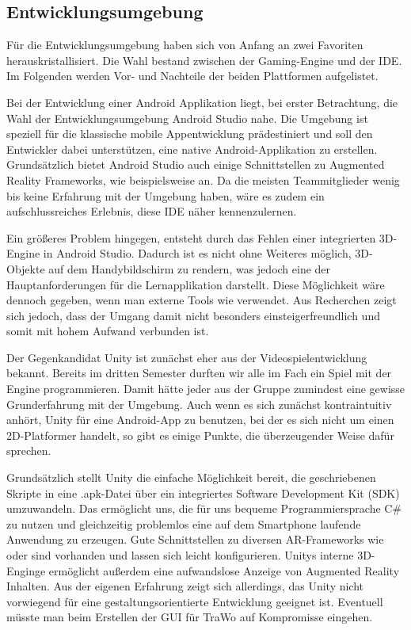 \subsection{Entwicklungsumgebung}\label{entwicklungsumgebung}
Für die Entwicklungsumgebung haben sich von Anfang an zwei Favoriten herauskristallisiert. Die Wahl bestand zwischen der Gaming-Engine  und der  IDE. Im Folgenden werden Vor- und Nachteile der beiden Plattformen aufgelistet.

Bei der Entwicklung einer Android Applikation liegt, bei erster Betrachtung, die Wahl der Entwicklungsumgebung Android Studio nahe. Die Umgebung ist speziell für die klassische mobile Appentwicklung prädestiniert und soll den Entwickler dabei unterstützen, eine native Android-Applikation zu erstellen. Grundsätzlich bietet Android Studio auch einige Schnittstellen zu Augmented Reality Frameworks, wie beispielsweise  an. Da die meisten Teammitglieder wenig bis keine Erfahrung mit der Umgebung haben, wäre es zudem ein aufschlussreiches Erlebnis, diese IDE näher kennenzulernen.

Ein größeres Problem hingegen, entsteht durch das Fehlen einer integrierten 3D-Engine in Android Studio. Dadurch ist es nicht ohne Weiteres möglich, 3D-Objekte auf dem Handybildschirm zu rendern, was jedoch eine der Hauptanforderungen für die Lernapplikation darstellt. Diese Möglichkeit wäre dennoch gegeben, wenn man externe Tools wie  verwendet. Aus Recherchen zeigt sich jedoch, dass der Umgang damit nicht besonders einsteigerfreundlich und somit mit hohem Aufwand verbunden ist.

Der Gegenkandidat Unity ist zunächst eher aus der Videospielentwicklung bekannt. Bereits im dritten Semester durften wir alle im Fach  ein Spiel mit der Engine programmieren. Damit hätte jeder aus der Gruppe zumindest eine gewisse Grunderfahrung mit der Umgebung. Auch wenn es sich zunächst kontraintuitiv anhört, Unity für eine Android-App zu benutzen, bei der es sich nicht um einen 2D-Platformer handelt, so gibt es einige Punkte, die überzeugender Weise dafür sprechen.

Grundsätzlich stellt Unity die einfache Möglichkeit bereit, die geschriebenen Skripte in eine .apk-Datei über ein integriertes Software Development Kit (SDK) umzuwandeln. Das ermöglicht uns, die für uns bequeme Programmiersprache C\# zu nutzen und gleichzeitig problemlos eine auf dem Smartphone laufende Anwendung zu erzeugen. Gute Schnittstellen zu diversen AR-Frameworks wie  oder  sind vorhanden und lassen sich leicht konfigurieren. Unitys interne 3D-Enginge ermöglicht außerdem eine aufwandslose Anzeige von Augmented Reality Inhalten. Aus der eigenen Erfahrung zeigt sich allerdings, das Unity nicht vorwiegend für eine gestaltungsorientierte Entwicklung geeignet ist. Eventuell müsste man beim Erstellen der GUI für TraWo auf Kompromisse eingehen.

